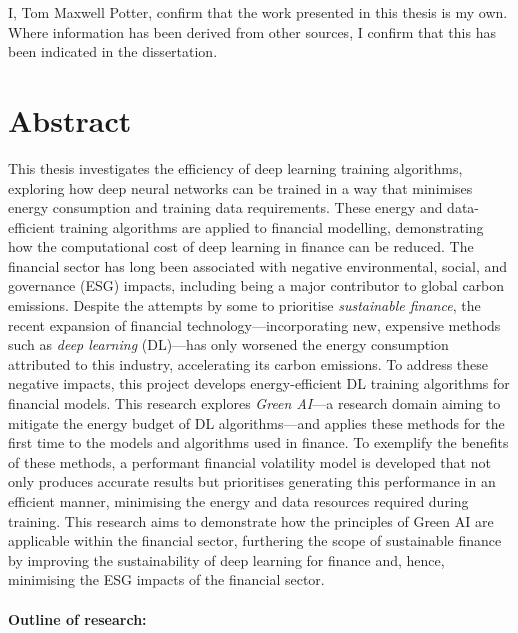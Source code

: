 \documentclass[a4paper, 11pt]{report}
\begin{document}
    I, Tom Maxwell Potter, confirm that the work presented in this thesis is my own. Where information has been derived from other sources, I confirm that this has been indicated in the dissertation.


    \newpage

    \chapter*{Abstract}

    This thesis investigates the efficiency of deep learning training algorithms, exploring how deep neural networks can be trained in a way that minimises energy consumption and training data requirements. These energy and data-efficient training algorithms are applied to financial modelling, demonstrating how the computational cost of deep learning in finance can be reduced. The financial sector has long been associated with negative environmental, social, and governance (ESG) impacts, including being a major contributor to global carbon emissions. Despite the attempts by some to prioritise \emph{sustainable finance}, the recent expansion of financial technology---incorporating new, expensive methods such as \emph{deep learning} (DL)---has only worsened the energy consumption attributed to this industry, accelerating its carbon emissions. To address these negative impacts, this project develops energy-efficient DL training algorithms for financial models. This research explores \emph{Green AI}---a research domain aiming to mitigate the energy budget of DL algorithms---and applies these methods for the first time to the models and algorithms used in finance. To exemplify the benefits of these methods, a performant financial volatility model is developed that not only produces accurate results but prioritises generating this performance in an efficient manner, minimising the energy and data resources required during training. This research aims to demonstrate how the principles of Green AI are applicable within the financial sector, furthering the scope of sustainable finance by improving the sustainability of deep learning for finance and, hence, minimising the ESG impacts of the financial sector.
    \\
    \textbf{\\Outline of research:} 
\end{document}
